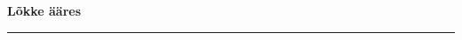 \documentclass[10pt]{book}
\begin{document}
{
  \samepage
  \raggedbottom
  \raggedright
  \sloppy


  \vspace{0.2in}

  \noindent\begin{minipage}{.1\textwidth}
    \hfill\vspace{0.1in}
  \end{minipage}%
  \noindent\begin{minipage}{.8\textwidth}
    \centering
    \bfseries
    \large L\~okke \"a\"ares
  \end{minipage}%
  \noindent\begin{minipage}{.1\textwidth}
      \hfill\vspace{0.1in}
  \end{minipage}

  \nopagebreak[4]
  \vspace{0.1in}
  \nopagebreak[4]
  \hrule height 0.05ex
  \nopagebreak[4]
  \vspace{-0.05in}




}
\end{document}

